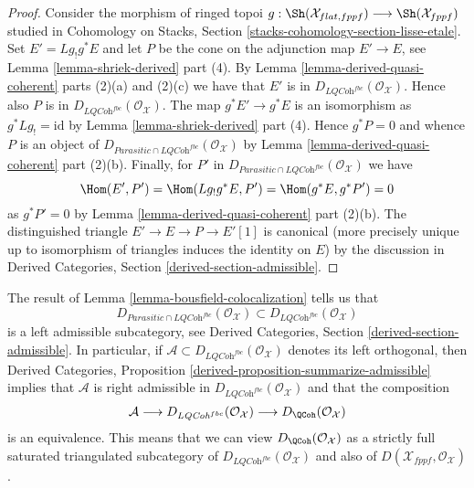 \begin{proof}
Consider the morphism of ringed topoi
$g : \Sh(\mathcal{X}_{flat, fppf}) \longrightarrow \Sh(\mathcal{X}_{fppf})$
studied in Cohomology on Stacks, Section
\ref{stacks-cohomology-section-lisse-etale}.
Set $E' = Lg_!g^*E$ and let $P$ be the cone on the adjunction
map $E' \to E$, see Lemma \ref{lemma-shriek-derived} part (4).
By Lemma \ref{lemma-derived-quasi-coherent} parts (2)(a) and (2)(c)
we have that $E'$ is in $D_{\textit{LQCoh}^{fbc}}(\mathcal{O}_\mathcal{X})$.
Hence also $P$ is in $D_{\textit{LQCoh}^{fbc}}(\mathcal{O}_\mathcal{X})$.
The map $g^*E' \to g^*E$ is an isomorphism as $g^*Lg_! = \text{id}$ by
Lemma \ref{lemma-shriek-derived} part (4).
Hence $g^*P = 0$ and whence $P$ is an object of
$D_{\textit{Parasitic} \cap \textit{LQCoh}^{fbc}}(\mathcal{O}_\mathcal{X})$ by
Lemma \ref{lemma-derived-quasi-coherent} part (2)(b).
Finally, for $P'$ in
$D_{\textit{Parasitic} \cap \textit{LQCoh}^{fbc}}(\mathcal{O}_\mathcal{X})$
we have
$$
\Hom(E', P') = \Hom(Lg_!g^*E, P') = \Hom(g^*E, g^*P') = 0
$$
as $g^*P' = 0$ by Lemma \ref{lemma-derived-quasi-coherent} part (2)(b).
The distinguished triangle $E' \to E \to P \to E'[1]$ is canonical
(more precisely unique up to isomorphism of triangles induces the
identity on $E$) by the discussion in Derived Categories, Section
\ref{derived-section-admissible}.
\end{proof}

\begin{remark}
\label{remark-QCoh-admissible}
The result of Lemma \ref{lemma-bousfield-colocalization} tells us that
$$
D_{\textit{Parasitic} \cap \textit{LQCoh}^{fbc}}(\mathcal{O}_\mathcal{X})
\subset
D_{\textit{LQCoh}^{fbc}}(\mathcal{O}_\mathcal{X})
$$
is a left admissible subcategory, see
Derived Categories, Section \ref{derived-section-admissible}.
In particular, if
$\mathcal{A} \subset D_{\textit{LQCoh}^{fbc}}(\mathcal{O}_\mathcal{X})$
denotes its left orthogonal, then Derived Categories, Proposition
\ref{derived-proposition-summarize-admissible}
implies that $\mathcal{A}$ is right admissible in
$D_{\textit{LQCoh}^{fbc}}(\mathcal{O}_\mathcal{X})$ and that
the composition
$$
\mathcal{A} \longrightarrow
D_{\textit{LQCoh}^{fbc}}(\mathcal{O}_\mathcal{X}) \longrightarrow
D_\QCoh(\mathcal{O}_\mathcal{X})
$$
is an equivalence. This means that we can view
$D_\QCoh(\mathcal{O}_\mathcal{X})$ as a strictly full saturated
triangulated subcategory of $D_{\textit{LQCoh}^{fbc}}(\mathcal{O}_\mathcal{X})$
and also of $D(\mathcal{X}_{fppf}, \mathcal{O}_\mathcal{X})$.
\end{remark}





